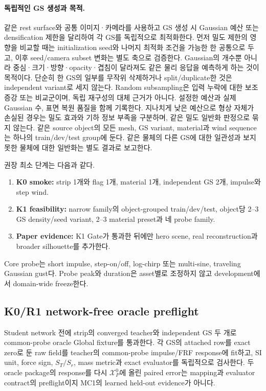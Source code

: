 \documentclass[11pt]{article}
\begin{document}
\paragraph{독립적인 GS 생성과 목적.}
같은 rest surface와 공통 이미지·카메라를 사용하고 GS 생성 시 Gaussian 예산 또는 densification 제한을
달리하여 각 GS를 독립적으로 최적화한다. 먼저 밀도 제한의 영향을 비교할 때는 initialization seed와
나머지 최적화 조건을 가능한 한 공통으로 두고, 이후 seed/camera subset 변화는 별도 축으로 검증한다.
Gaussian의 개수뿐 아니라 중심·크기·방향·opacity·겹침이 달라져도 같은 물리 응답을 예측하게 하는 것이 목적이다.
단순히 한 GS의 일부를 무작위 삭제하거나 split/duplicate한 것은 independent variant로 세지 않는다.
Random subsampling은 입력 누락에 대한 보조 증강 또는 비교군이며, 독립 재구성의 대체 근거가 아니다.
설정한 예산과 실제 Gaussian 수, 표면 복원 품질을 함께 기록한다. 지나치게 낮은 예산으로 형상 자체가
손실된 경우는 밀도 효과와 기하 정보 부족을 구분하며, 같은 밀도 일반화 판정으로 묶지 않는다.
같은 source object의 모든 mesh, GS variant, material과 wind sequence는 하나의 train/dev/test group에 둔다.
같은 물체의 다른 GS에 대한 일관성과 보지 못한 물체에 대한 일반화는 별도 결과로 보고한다.

권장 최소 단계는 다음과 같다.

\begin{enumerate}
  \item \textbf{K0 smoke:} strip 1개와 flag 1개, material 1개, independent GS 2개, impulse와 step wind.
  \item \textbf{K1 feasibility:} narrow family의 object-grouped train/dev/test, object당 2--3 GS density/seed variant,
  2--3 material preset과 네 probe family.
  \item \textbf{Paper evidence:} K1 Gate가 통과한 뒤에만 hero scene, real reconstruction과 broader silhouette를 추가한다.
\end{enumerate}

Core probe는 short impulse, step-on/off, log-chirp 또는 multi-sine, traveling Gaussian gust다.
Probe peak와 duration은 asset별로 조정하지 않고 development에서 domain-wide freeze한다.

\subsection{K0/R1 network-free oracle preflight}

Student network 전에 strip의 converged teacher와 independent GS 두 개로 common-probe oracle Global
fixture를 통과한다. 각 GS의 attached row를 exact zero로 둔 raw field를 teacher의 common-probe
impulse/FRF response에 fit하고, SI unit, force sign, \(S_T/S_r\), mass metric과 exact evaluator를
독립적으로 검사한다. 두 oracle package의 response를 다시 \(\mathcal X_P^0\)에 올린 paired error는
mapping과 evaluator contract의 preflight이지 MC1의 learned held-out evidence가 아니다.
\end{document}
